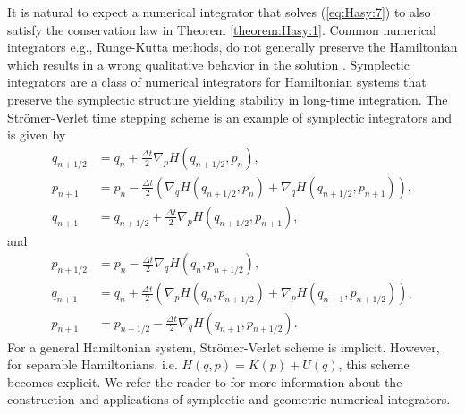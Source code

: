 {\edit It is natural to expect a numerical integrator that solves (\ref{eq:Hasy:7}) to also satisfy the conservation law in Theorem \ref{theorem:Hasy:1}. Common numerical integrators e.g., Runge-Kutta methods, do not generally preserve the Hamiltonian which results in a wrong qualitative behavior in the solution \cite{Hairer:1250576}. Symplectic integrators are a class of numerical integrators for Hamiltonian systems that preserve the symplectic structure yielding stability in long-time integration.} The Str\"omer-Verlet time stepping scheme is an example of symplectic integrators and is given by
\begin{equation} \label{eq:Hasy:13}
\begin{aligned}
	q_{n+1/2} &= q_n + \frac{\Delta t}{2} \nabla_pH(q_{n+1/2},p_n), \\
	p_{n+1} &= p_n - \frac{\Delta t}{2} \left( \nabla_qH(q_{n+1/2},p_n) + \nabla_qH(q_{n+1/2},p_{n+1}) \right),\\
	q_{n+1} &= q_{n+1/2} + \frac{\Delta t}{2} \nabla_pH(q_{n+1/2},p_{n+1}),
\end{aligned}
\end{equation}
and
\begin{equation} \label{eq:Hasy:14}
\begin{aligned}
	p_{n+1/2} &= p_n - \frac{\Delta t}{2} \nabla_qH(q_{n},p_{n+1/2}), \\
	q_{n+1} &= q_n + \frac{\Delta t}{2} \left( \nabla_pH(q_{n},p_{n+1/2}) + \nabla_pH(q_{n+1},p_{n+1/2}) \right),\\
	p_{n+1} &= p_{n+1/2} - \frac{\Delta t}{2} \nabla_qH(q_{n+1},p_{n+1/2}).
\end{aligned}
\end{equation}
For a general Hamiltonian system, Str\"omer-Verlet scheme is implicit. However, for separable Hamiltonians, i.e. $H(q,p) = K(p) + U(q)$, this {\edit scheme becomes} explicit. We refer the reader to \cite{Hairer:1250576} for more information about the construction and applications of symplectic and geometric numerical integrators. 
